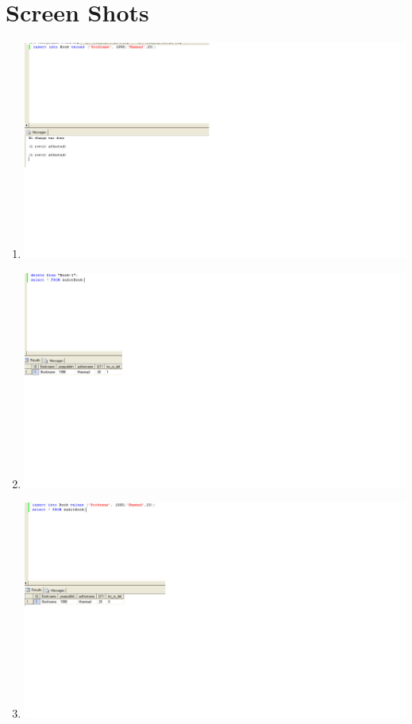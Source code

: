 \documentclass{article}
\begin{document}
\section{Screen Shots}
\begin{enumerate}
	\item
		\includegraphics[scale=0.5]{figs/im-par-1-insert.jpg}
	\item
		\includegraphics[scale=0.5]{figs/im-par-2-delete.jpg}
	\item
		\includegraphics[scale=0.5]{figs/im-par-2-insert.jpg}

\end{enumerate}
\end{document}
